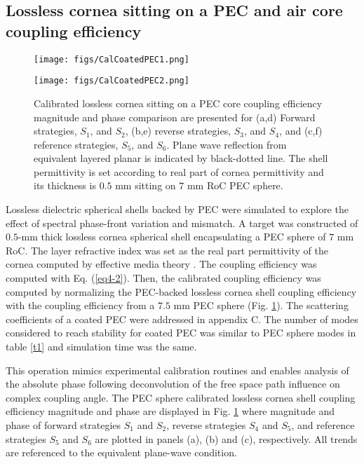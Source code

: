 \documentclass{osa-article}
\begin{document}
\subsection{Lossless cornea sitting on a PEC and air core coupling efficiency}
\begin{figure}[ht]
\centering
\texttt{[image: figs/CalCoatedPEC1.png]}
\vspace*{-6 mm}

\texttt{[image: figs/CalCoatedPEC2.png]}
\caption{Calibrated lossless cornea sitting on a PEC core coupling efficiency magnitude and phase comparison are presented for (a,d) Forward strategies, $S_1$, and $S_2$, (b,e) reverse strategies, $S_3$, and $S_4$, and (c,f) reference strategies, $S_5$, and $S_6$. Plane wave reflection from equivalent layered planar is indicated by black-dotted line. The shell permittivity is set according to real part of cornea permittivity and its thickness is $0.5$ mm sitting on $7$ mm RoC PEC sphere.}\label{Q}
\end{figure}

Lossless dielectric spherical shells backed by PEC were simulated to explore the effect of spectral phase-front variation and mismatch. A target was constructed of $0.5$-mm thick lossless cornea spherical shell encapsulating a PEC sphere of $7$ mm RoC. The layer refractive index was set as the real part permittivity of the cornea computed by effective media theory \cite{ari}. The coupling efficiency was computed with Eq. (\ref{eq4-2}). Then, the calibrated coupling efficiency was computed by normalizing the PEC-backed lossless cornea shell coupling efficiency with the coupling efficiency from a $7.5$ mm PEC sphere (Fig. \ref{Q}). The scattering coefficients of a coated PEC were addressed in appendix C. The number of modes considered to reach stability for coated PEC was similar to PEC sphere modes in table \ref{t1} and simulation time was the same.

This operation mimics experimental calibration routines \cite{quasi} and enables analysis of the absolute phase following deconvolution of the free space path influence on complex coupling angle. The PEC sphere calibrated lossless cornea shell coupling efficiency magnitude and phase are displayed in Fig. \ref{Q} where magnitude and phase of forward strategies $S_1$ and $S_2$, reverse strategies $S_4$ and $S_5$, and reference strategies $S_5$ and $S_6$ are plotted in panels (a), (b) and (c), respectively. All trends are referenced to the equivalent plane-wave condition.
\end{document}
